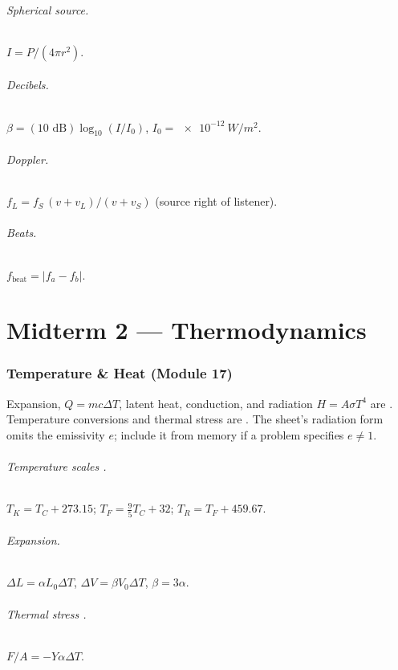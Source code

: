 \documentclass[11pt]{article}
\begin{document}
\paragraph{Spherical source.} $I = P/(4\pi r^{2})$.
\paragraph{Decibels.} $\beta = (10\text{ dB})\log_{10}(I/I_0)$, $I_0 = \SI{e-12}{W/m^{2}}$.
\paragraph{Doppler.} $f_L = f_S\,(v + v_L)/(v + v_S)$ (source right of listener).
\paragraph{Beats.} $f_{\text{beat}} = |f_a - f_b|$.

\part*{Midterm 2 --- Thermodynamics}

\section{Temperature \& Heat (Module 17)}
Expansion, $Q = mc\Delta T$, latent heat, conduction, and radiation $H = A\sigma T^4$
are . Temperature conversions and thermal stress are
. The sheet's radiation form omits the emissivity $e$;
include it from memory if a problem specifies $e \ne 1$.

\paragraph{Temperature scales .} $T_K = T_C + 273.15$; $T_F = \tfrac{9}{5}T_C + 32$; $T_R = T_F + 459.67$.
\paragraph{Expansion.}
$\Delta L = \alpha L_0 \Delta T$, $\Delta V = \beta V_0\Delta T$, $\beta = 3\alpha$.
\paragraph{Thermal stress .} $F/A = -Y\alpha\Delta T$.
\end{document}
